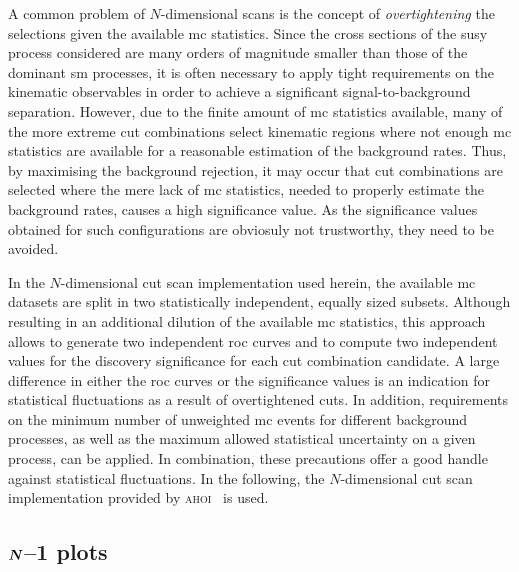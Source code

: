 A common problem of $N$-dimensional scans is the concept of \textit{overtightening} the selections given the available \gls{mc} statistics.
Since the cross sections of the \gls{susy} process considered are many orders of magnitude smaller than those of the dominant \gls{sm} processes, it is often necessary to apply tight requirements on the kinematic observables in order to achieve a significant signal-to-background separation.
However, due to the finite amount of \gls{mc} statistics available, many of the more extreme cut combinations select kinematic regions where not enough \gls{mc} statistics are available for a reasonable estimation of the background rates.
Thus, by maximising the background rejection, it may occur that cut combinations are selected where the mere lack of \gls{mc} statistics, needed to properly estimate the background rates, causes a high significance value.
As the significance values obtained for such configurations are obviosuly not trustworthy, they need to be avoided. 

In the $N$-dimensional cut scan implementation used herein, the available \gls{mc} datasets are split in two statistically independent, equally sized subsets. Although resulting in an additional dilution of the available \gls{mc} statistics, this approach allows to generate two independent \gls{roc} curves and  to compute two independent values for the discovery significance for each cut combination candidate. A large difference in either the \gls{roc} curves or the significance values is an indication for statistical fluctuations as a result of overtightened cuts. In addition, requirements on the minimum number of unweighted \gls{mc} events for different background processes, as well as the maximum allowed statistical uncertainty on a given process, can be applied. In combination, these precautions offer a good handle against statistical fluctuations. In the following, the $N$-dimensional cut scan implementation provided by \textsc{ahoi}~\cite{ahoi} is used.

\subsection[\textit{N}--1]{$\makemebold{N}$--1 plots}\label{sec:n-1-scan}

